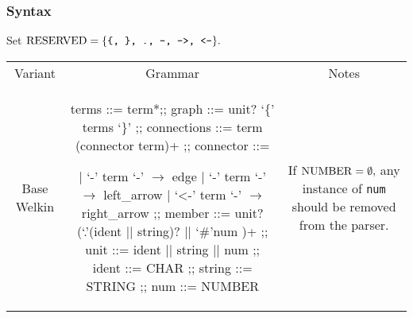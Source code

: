 \subsubsection*{Syntax}
Set $\mathrm{RESERVED} = \{\texttt{\{, \}, ., -, ->, <-}\}.$

\begin{center}
  \begin{tabular}{ | c | c | c |}
	Variant & Grammar & Notes \\
	Base Welkin &
  \begin{bnf}
  terms ::= term*;;
  graph ::= unit? `\{' terms `\}' ;;
  connections ::= term (connector term)+ ;;
	connector ::=

   | `-' term `-' $\to$ edge
   | `-' term `-\>' $\to$ left\_arrow
	 | `<-' term `-' $\to$ right\_arrow ;;
  member ::= unit? (`.'(ident || string)? || `\#'num )+ ;;
	unit ::= ident || string || num ;;
  ident ::= CHAR\* ;;
	string ::= STRING ;;
	num ::= NUMBER
\end{bnf}
& If $\mathrm{NUMBER} = \emptyset,$ any instance of \texttt{num} should be removed from the parser. \\

\end{tabular}
\end{center}





